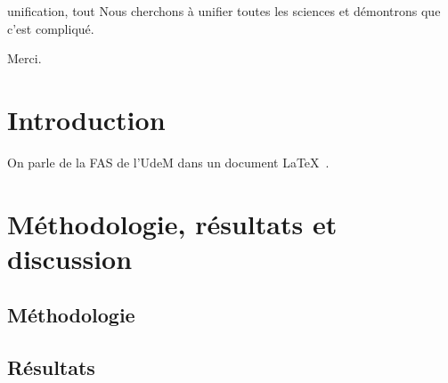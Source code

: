 \documentclass[phd]{dissertum}
\date{Août}{2023}
\begin{document}
  \pagetitre
  \pagejury

  \begin{resume}{unification, tout}
    Nous cherchons à unifier toutes les sciences et démontrons que c'est compliqué.
  \end{resume}

  \begin{abstract}{unification, everything}
    We try to unify all sciences and prove that it is complicated.
  \end{abstract}

  \matieres

    \begin{acronym}
    \end{acronym}


    Merci.

    \lipsum[1-2]


  \chapter{Introduction}
    On parle de la \ac{FAS} de l'\ac{UdeM} dans un document \LaTeX\ \citep{knuth84}.

    \lipsum[3-6]

  \chapter{Méthodologie, résultats et discussion}
    \lipsum[7-8]
    \section{Méthodologie}
      \lipsum[9-10]
    \section{Résultats}
      \lipsum[11-12]
\end{document}
